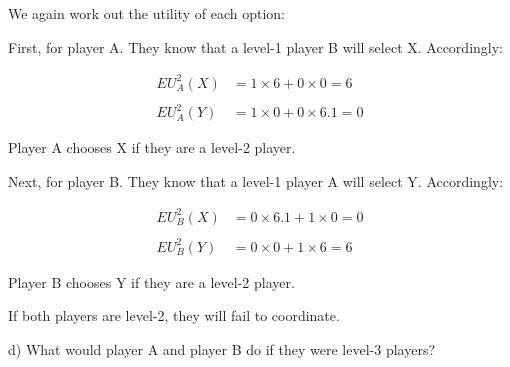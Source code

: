 \documentclass[
  letterpaper,
  DIV=11,
  numbers=noendperiod]{scrreprt}
\begin{document}
\begin{tcolorbox}[enhanced jigsaw, title=\textcolor{quarto-callout-tip-color}{\faLightbulb}\hspace{0.5em}{Answer}, toprule=.15mm, colback=white, breakable, titlerule=0mm, colframe=quarto-callout-tip-color-frame, coltitle=black, opacityback=0, rightrule=.15mm, colbacktitle=quarto-callout-tip-color!10!white, bottomtitle=1mm, opacitybacktitle=0.6, arc=.35mm, bottomrule=.15mm, toptitle=1mm, leftrule=.75mm, left=2mm]

We again work out the utility of each option:

First, for player A. They know that a level-1 player B will select X.
Accordingly:

\begin{align*}
EU^{2}_{A}(X)&=1\times 6+0\times 0=6 \\
\\
EU^{2}_{A}(Y)&=1\times 0+0\times 6.1=0
\end{align*}

Player A chooses X if they are a level-2 player.

Next, for player B. They know that a level-1 player A will select Y.
Accordingly:

\begin{align*}
EU ^{2}_{B}(X)&= 0\times 6.1+1\times0=0 \\
\\
EU ^{2}_{B}(Y)&= 0\times 0+1\times 6=6
\end{align*}

Player B chooses Y if they are a level-2 player.

If both players are level-2, they will fail to coordinate.

\end{tcolorbox}

d) What would player A and player B do if they were level-3 players?
\end{document}
